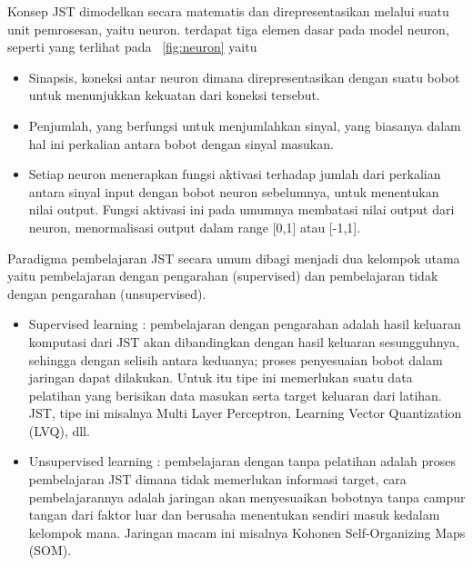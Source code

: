 Konsep JST dimodelkan secara matematis dan direpresentasikan melalui suatu unit
pemrosesan, yaitu neuron. terdapat tiga elemen dasar pada model neuron,
seperti yang terlihat pada \pic~\ref{fig:neuron} yaitu
\begin{itemize}
  \item Sinapsis, koneksi antar neuron dimana direpresentasikan dengan suatu
  bobot untuk menunjukkan kekuatan dari koneksi tersebut.
  \item Penjumlah, yang berfungsi untuk menjumlahkan sinyal, yang
  biasanya dalam hal ini perkalian antara bobot dengan sinyal masukan.
  \item Setiap neuron menerapkan fungsi aktivasi terhadap jumlah dari perkalian
  antara sinyal input dengan bobot neuron sebelumnya, untuk menentukan nilai
  output. Fungsi aktivasi ini pada umumnya membatasi nilai output dari neuron,
  menormalisasi output dalam range [0,1] atau [-1,1].
\end{itemize}


Paradigma pembelajaran JST secara umum dibagi menjadi dua kelompok utama yaitu
pembelajaran dengan pengarahan (supervised) dan pembelajaran tidak dengan
pengarahan (unsupervised).
\begin{itemize}
  \item Supervised learning : pembelajaran dengan pengarahan adalah hasil
  keluaran komputasi dari JST akan dibandingkan dengan hasil keluaran
  sesungguhnya, sehingga dengan selisih antara keduanya; proses penyesuaian
  bobot dalam jaringan dapat dilakukan. Untuk itu tipe ini memerlukan suatu data
  pelatihan yang berisikan data masukan serta target keluaran dari latihan. JST,
  tipe ini misalnya Multi Layer Perceptron, Learning Vector Quantization (LVQ), dll.

  \item Unsupervised learning : pembelajaran dengan tanpa pelatihan
  adalah proses pembelajaran JST dimana tidak memerlukan
  informasi target, cara pembelajarannya adalah jaringan akan menyesuaikan
  bobotnya tanpa campur tangan dari faktor luar dan berusaha menentukan sendiri
  masuk kedalam kelompok mana. Jaringan macam ini misalnya Kohonen
  Self-Organizing Maps (SOM).
\end{itemize}

